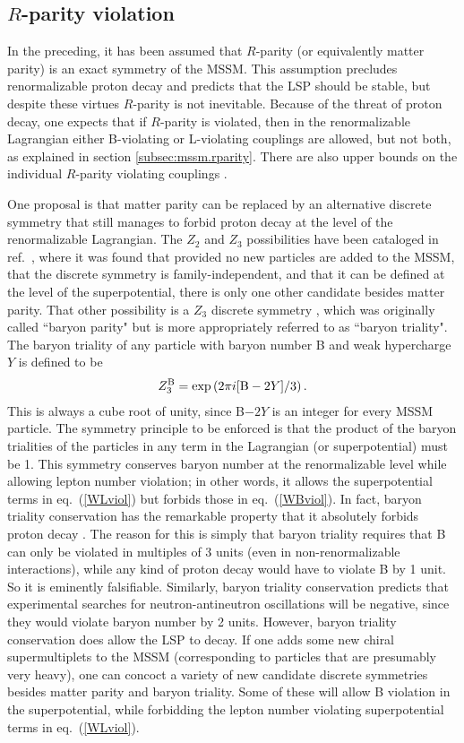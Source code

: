 \documentclass[12pt]{article}
\def\beq{\begin{eqnarray}}
\def\eeq{\end{eqnarray}}
\begin{document}
\subsection{$R$-parity violation}\label{subsec:variations.RPV}
\setcounter{equation}{0}

In the preceding, it has been assumed that $R$-parity (or equivalently matter parity) is
an exact symmetry of the MSSM. This assumption precludes renormalizable
proton decay and predicts that the LSP should be stable, but despite these
virtues $R$-parity is not inevitable. Because of the threat of proton
decay, one expects that if $R$-parity is violated, then in the
renormalizable Lagrangian either B-violating or L-violating couplings are
allowed, but not both, as explained in section \ref{subsec:mssm.rparity}. 
There are also upper bounds on the individual $R$-parity violating
couplings \cite{RPVreviews}. 

One proposal is that matter parity can be replaced by an alternative
discrete symmetry that still manages to forbid proton decay at the level
of the renormalizable Lagrangian. The $Z_2$ and $Z_3$ possibilities have
been cataloged in ref.~\cite{baryontriality}, where it was found that
provided no new particles are added to the MSSM, that the discrete
symmetry is family-independent, and that it can be defined at the level of
the superpotential, there is only one other candidate besides matter
parity. That other possibility is a $Z_3$ discrete symmetry
\cite{baryontriality}, which was originally called ``baryon parity" but is
more appropriately referred to as ``baryon triality". The baryon triality
of any particle with baryon number B and weak hypercharge $Y$ is defined
to be
\beq
Z_3^{\rm B} = {\rm exp}\left ({2\pi i} [{\rm B}-2Y]/3 \right ).
\eeq
This is always a cube root of unity, since B$-2Y$ is an integer for every
MSSM particle. The symmetry principle to be enforced is that the product
of the baryon trialities of the particles in any term in the Lagrangian
(or superpotential) must be 1. This symmetry conserves baryon number at
the renormalizable level while allowing lepton number violation; in other
words, it allows the superpotential terms in eq.~(\ref{WLviol}) but
forbids those in eq.~(\ref{WBviol}). In fact, baryon triality conservation
has the remarkable property that it absolutely forbids proton
decay \cite{noprotondecay}. The reason for this is simply that baryon
triality requires that B can only be violated in multiples of 3 units
(even in non-renormalizable interactions), while any kind of proton decay
would have to violate B by 1 unit. So it is eminently falsifiable.
Similarly, baryon triality conservation predicts that experimental
searches for neutron-antineutron oscillations will be negative, since they
would violate baryon number by 2 units. However, baryon triality
conservation does allow the LSP to decay. If one adds some new chiral
supermultiplets to the MSSM (corresponding to particles that are
presumably very heavy), one can concoct a variety of new candidate
discrete symmetries besides matter parity and baryon triality. Some of
these will allow B violation in the superpotential, while forbidding the
lepton number violating superpotential terms in eq.~(\ref{WLviol}). 
\end{document}
